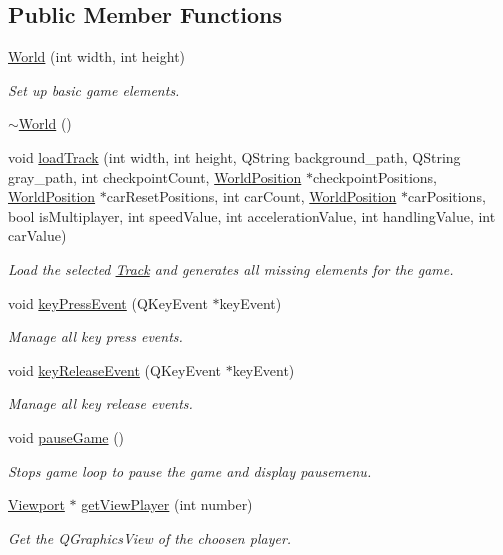 \subsection*{Public Member Functions}
\begin{DoxyCompactItemize}
\item 
\mbox{\hyperlink{class_world_ad81bca72650b2291afedb229c6e215b7}{World}} (int width, int height)
\begin{DoxyCompactList}\small\item\em Set up basic game elements. \end{DoxyCompactList}\item 
\mbox{\hyperlink{class_world_a8c73fba541a5817fff65147ba47cd827}{$\sim$\+World}} ()
\item 
void \mbox{\hyperlink{class_world_a195350846001070a93027c8f8f1ec211}{load\+Track}} (int width, int height, Q\+String background\+\_\+path, Q\+String gray\+\_\+path, int checkpoint\+Count, \mbox{\hyperlink{class_world_position}{World\+Position}} $\ast$checkpoint\+Positions, \mbox{\hyperlink{class_world_position}{World\+Position}} $\ast$car\+Reset\+Positions, int car\+Count, \mbox{\hyperlink{class_world_position}{World\+Position}} $\ast$car\+Positions, bool is\+Multiplayer, int speed\+Value, int acceleration\+Value, int handling\+Value, int car\+Value)
\begin{DoxyCompactList}\small\item\em Load the selected \mbox{\hyperlink{class_track}{Track}} and generates all missing elements for the game. \end{DoxyCompactList}\item 
void \mbox{\hyperlink{class_world_a953a781e77b87cd47433e0a24c4b1cbd}{key\+Press\+Event}} (Q\+Key\+Event $\ast$key\+Event)
\begin{DoxyCompactList}\small\item\em Manage all key press events. \end{DoxyCompactList}\item 
void \mbox{\hyperlink{class_world_a8b8a8bd9430e38dbaae2bd4ef0f16c92}{key\+Release\+Event}} (Q\+Key\+Event $\ast$key\+Event)
\begin{DoxyCompactList}\small\item\em Manage all key release events. \end{DoxyCompactList}\item 
void \mbox{\hyperlink{class_world_a4dab92003272398079aa82f37e53716a}{pause\+Game}} ()
\begin{DoxyCompactList}\small\item\em Stops game loop to pause the game and display pausemenu. \end{DoxyCompactList}\item 
\mbox{\hyperlink{class_viewport}{Viewport}} $\ast$ \mbox{\hyperlink{class_world_aa3c1a0e1064a02a465f9e4c3574fd6bd}{get\+View\+Player}} (int number)
\begin{DoxyCompactList}\small\item\em Get the Q\+Graphics\+View of the choosen player. \end{DoxyCompactList}\end{DoxyCompactItemize}
